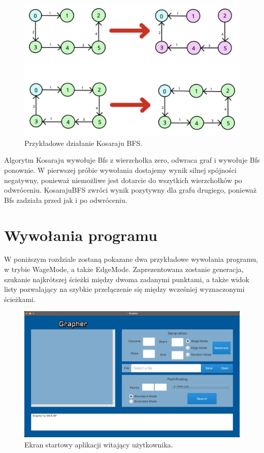 \documentclass[10pt, a4paper]{report}
\begin{document}
\begin{figure}[h]
  \begin{center}
    \includegraphics[scale=0.19]{KosarajuInvertedBfsExample.jpg}
    \caption{Przykładowe działanie Kosaraju BFS.}
  \end{center}
\end{figure}
Algorytm Kosaraju wywołuje Bfs z wierzchołka zero, odwraca graf i wywołuje Bfs ponownie. 
W pierwszej próbie wywołania dostajemy wynik silnej spójności negatywny, ponieważ niemożliwe jest dotarcie do wszytkich wierzchołków po odwróceniu. KosarajuBFS zwróci wynik pozytywny dla grafu drugiego, ponieważ Bfs zadziała przed jak i po odwróceniu.
\newpage

\section{Wywołania programu}\label{sec:wywołania-programu}
W poniższym rozdziale zostaną pokazane dwa przykładowe wywołania programu, w
trybie WageMode, a także EdgeMode.
Zaprezentowana zostanie generacja, szukanie najkrótszej ścieżki między dwoma
zadanymi punktami,
a także widok listy pozwalający na szybkie przełączenie się między wcześniej
wyznaczonymi ścieżkami.

\begin{figure}[h]
  \begin{center}
    \includegraphics[scale=0.165]{graperStartScreen.jpg}
    \caption{Ekran startowy aplikacji witający użytkownika.}
  \end{center}
\end{figure}
\end{document}
